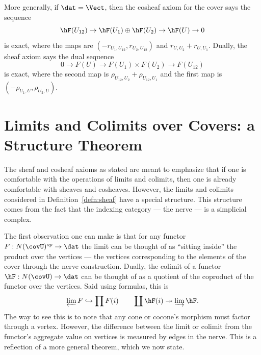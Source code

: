 \begin{ex}
	More generally, if $\dat=\Vect$, then the cosheaf axiom for the cover says the sequence
	\[
	\hF(U_{12}) \to \hF(U_1)\oplus\hF(U_2) \to \hF(U) \to 0
	\]
	is exact, where the maps are $(-r_{U_1,U_{12}},r_{U_2,U_{12}})$ and $r_{U,U_2}+r_{U,U_1}$. Dually, the sheaf axiom says the dual sequence
	\[
	0 \to F(U)\to F(U_1)\times F(U_2) \to F(U_{12})
	\]
	is exact, where the second map is $\rho_{U_{12},U_2}+\rho_{U_{12},U_1}$ and the first map is $(-\rho_{U_1,U},\rho_{U_2,U})$.
\end{ex}

\section{Limits and Colimits over Covers: a Structure Theorem}
\label{subsec:cover_structure}

The sheaf and cosheaf axioms as stated are meant to emphasize that if one is comfortable with the operations of limits and colimits, then one is already comfortable with sheaves and cosheaves. However, the limits and colimits considered in Definition~\ref{defn:sheaf} have a special structure. This structure comes from the fact that the indexing category --- the nerve --- is a simplicial complex.

The first observation one can make is that for any functor $F:N(\covU)^{op}\to\dat$ the limit can be thought of as ``sitting inside'' the product over the vertices --- the vertices corresponding to the elements of the cover through the nerve construction. Dually, the colimit of a functor $\hF:N(\covU)\to\dat$ can be thought of as a quotient of the coproduct of the functor over the vertices. Said using formulas, this is
\begin{equation*}
	\varprojlim F \hookrightarrow \prod F(i) \qquad \coprod \hF(i) \twoheadrightarrow \varinjlim \hF.
\end{equation*}
The way to see this is to note that any cone or cocone's morphism must factor through a vertex. However, the difference between the limit or colimit from the functor's aggregate value on vertices is measured by edges in the nerve. This is a reflection of a more general theorem, which we now state.

